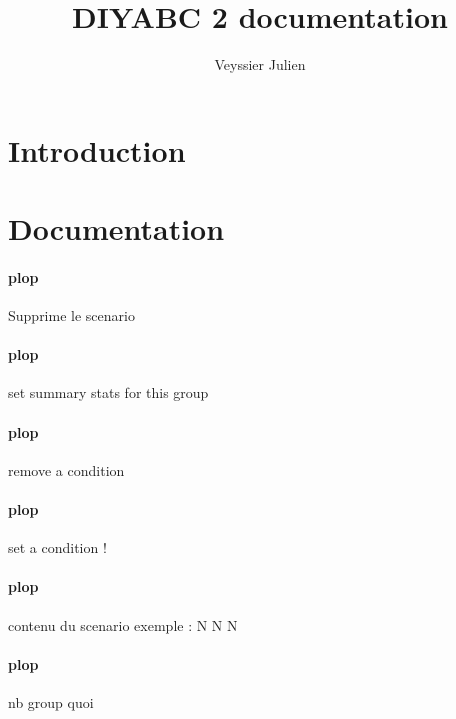 \documentclass[a4paper]{article}
\author{Veyssier Julien}
\title{DIYABC 2 documentation}
\begin{document}
\maketitle
\newpage

\tableofcontents

\newpage
 

\section{Introduction}

\section{Documentation}
        \paragraph{plop}
        \label{doc_rmScButton}
        Supprime le scenario

        \paragraph{plop}
        \label{doc_setSumButton}
        set summary stats for this group

        \paragraph{plop}
        \label{doc_rmCondButton}
        remove a condition

        \paragraph{plop}
        \label{doc_setCondButton}
        set a condition !

        \paragraph{plop}
        \label{doc_scplainTextEdit}
        contenu du scenario \newline exemple : \newline N N N

        \paragraph{plop}
        \label{doc_nbGroupLabel}
        nb group quoi
\end{document}

